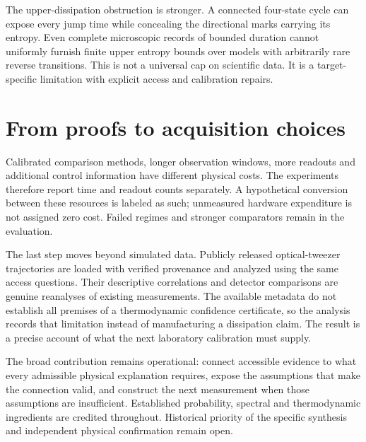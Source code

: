 The upper-dissipation obstruction is stronger. A connected four-state cycle
can expose every jump time while concealing the directional marks carrying
its entropy. Even complete microscopic records of bounded duration cannot
uniformly furnish finite upper entropy bounds over models with arbitrarily
rare reverse transitions. This is not a universal cap on scientific data.
It is a target-specific limitation with explicit access and calibration
repairs.

\section{From proofs to acquisition choices}
Calibrated comparison methods, longer observation windows, more readouts and
additional control information have different physical costs. The experiments
therefore report time and readout counts separately. A hypothetical conversion
between these resources is labeled as such; unmeasured hardware expenditure
is not assigned zero cost. Failed regimes and stronger comparators remain in
the evaluation.

The last step moves beyond simulated data. Publicly released optical-tweezer
trajectories are loaded with verified provenance and analyzed using the same
access questions. Their descriptive correlations and detector comparisons
are genuine reanalyses of existing measurements. The available metadata do
not establish all premises of a thermodynamic confidence certificate, so the
analysis records that limitation instead of manufacturing a dissipation claim.
The result is a precise account of what the next laboratory calibration must
supply.

The broad contribution remains operational: connect accessible evidence to
what every admissible physical explanation requires, expose the assumptions
that make the connection valid, and construct the next measurement when those
assumptions are insufficient. Established probability, spectral and
thermodynamic ingredients are credited throughout. Historical priority of the
specific synthesis and independent physical confirmation remain open.


